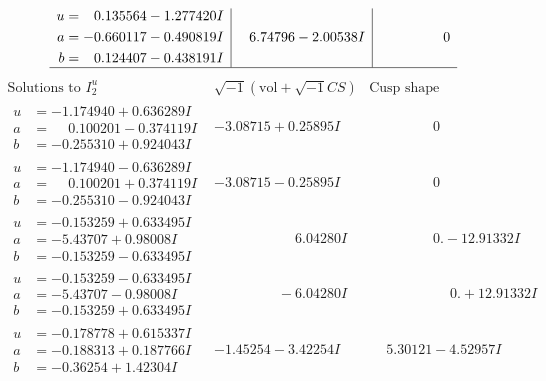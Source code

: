 \documentclass[1p]{elsarticle_modified}
\theoremstyle{definition}
\newcommand{\I}{\sqrt{-1}}
\begin{document}
$$\begin{array}{c|c|c}
\begin{aligned}
u &= \phantom{-}0.135564 - 1.277420 I \\
a &= -0.660117 - 0.490819 I \\
b &= \phantom{-}0.124407 - 0.438191 I\end{aligned}
 & \phantom{-}6.74796 - 2.00538 I & \phantom{-0.000000 } 0\\
 \hline 
 \end{array}$$\newpage$$\begin{array}{c|c|c}  
\text{Solutions to }I^u_{2}& \I (\text{vol} + \sqrt{-1}CS) & \text{Cusp shape}\\
 \hline 
\begin{aligned}
u &= -1.174940 + 0.636289 I \\
a &= \phantom{-}0.100201 - 0.374119 I \\
b &= -0.255310 + 0.924043 I\end{aligned}
 & -3.08715 + 0.25895 I & \phantom{-0.000000 } 0 \\ \hline\begin{aligned}
u &= -1.174940 - 0.636289 I \\
a &= \phantom{-}0.100201 + 0.374119 I \\
b &= -0.255310 - 0.924043 I\end{aligned}
 & -3.08715 - 0.25895 I & \phantom{-0.000000 } 0 \\ \hline\begin{aligned}
u &= -0.153259 + 0.633495 I \\
a &= -5.43707 + 0.98008 I \\
b &= -0.153259 - 0.633495 I\end{aligned}
 & \phantom{-0.000000 -}6.04280 I & \phantom{-0.000000 } 0. - 12.91332 I \\ \hline\begin{aligned}
u &= -0.153259 - 0.633495 I \\
a &= -5.43707 - 0.98008 I \\
b &= -0.153259 + 0.633495 I\end{aligned}
 & \phantom{-0.000000 } -6.04280 I & \phantom{-0.000000 -}0. + 12.91332 I \\ \hline\begin{aligned}
u &= -0.178778 + 0.615337 I \\
a &= -0.188313 + 0.187766 I \\
b &= -0.36254 + 1.42304 I\end{aligned}
 & -1.45254 - 3.42254 I & \phantom{-}5.30121 - 4.52957 I \\ \hline\begin{aligned}

\end{aligned}
\end{array}$$
\end{document}
